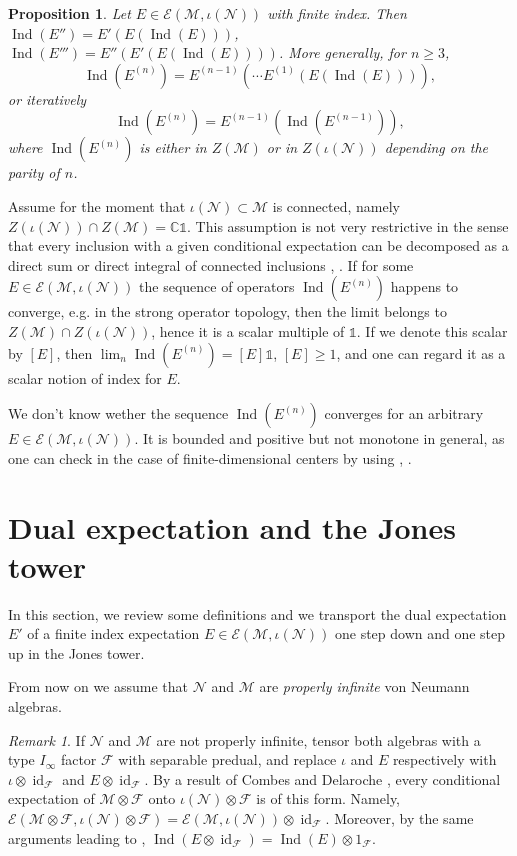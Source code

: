 \documentclass[11pt,a4paper]{article}
\makeatletter
\newcommand{\oneop}{\mathds{1}}
\newcommand{\cF}{\mathcal{F}}
\newcommand{\E}{\mathcal{E}}
\newcommand{\M}{\mathcal{M}}
\newcommand{\N}{\mathcal{N}}
\newcommand{\CC}{\mathbb{C}}
\DeclareMathOperator{\Ind}{Ind}
\DeclareMathOperator{\id}{id}
\DeclareRobustCommand{\eg}{e.g.\@\xspace}
\DeclareRobustCommand{\Prop}{Prop.\@\xspace}
\DeclareRobustCommand{\Lem}{Lem.\@\xspace}
\DeclareRobustCommand{\Thm}{Thm.\@\xspace}
\DeclareRobustCommand{\Rmk}{Rmk.\@\xspace}
\theoremstyle{plain}
\newtheorem{prop}[thm]{Proposition}
\theoremstyle{definition}
\theoremstyle{remark}
\newtheorem{rmk}[thm]{Remark}
\numberwithin{equation}{section}%
\makeatother
\begin{document}
\begin{prop}\label{prop:interateddualexp}
Let $E\in \E(\M,\iota(\N))$ with finite index. Then $\Ind(E'') = E'(E(\Ind(E)))$, $\Ind(E''') = E''(E'(E(\Ind(E))))$. More generally, for $n\geq 3$, 
$$\Ind(E^{(n)}) = E^{(n-1)}(\cdots E^{(1)}(E(\Ind(E)))),$$
or iteratively
$$\Ind(E^{(n)}) = E^{(n-1)}(\Ind(E^{(n-1)})),$$
where $\Ind(E^{(n)})$ is either in $Z(\M)$ or in $Z(\iota(\N))$ depending on the parity of $n$.
\end{prop}

Assume for the moment that $\iota(\N) \subset \M$ is connected, namely $Z(\iota(\N))\cap Z(\M) = \CC\oneop$. This assumption is not very restrictive in the sense that every inclusion with a given conditional expectation can be decomposed as a direct sum or direct integral of connected inclusions \cite[\Rmk 3.4]{Ter92}, \cite[\Thm 1]{FiIs96}. If for some $E\in\E(\M,\iota(\N))$ the sequence of operators $\Ind(E^{(n)})$ happens to converge, \eg in the strong operator topology, then the limit belongs to $Z(\M) \cap Z(\iota(\N))$, hence it is a scalar multiple of $\oneop$. If we denote this scalar by $[E]$, then $\lim_n \Ind(E^{(n)}) = [E] \oneop$, $[E] \geq 1$, and one can regard it as a scalar notion of index for $E$. 

We don't know wether the sequence $\Ind(E^{(n)})$ converges for an arbitrary $E\in\E(\M,\iota(\N))$. It is bounded and positive but not monotone in general, as one can check in the case of finite-dimensional centers by using \cite[\Thm 2.5]{Hav90}, \cite[\Prop 2.3]{Ter92}.


\section{Dual expectation and the Jones tower}\label{sec:dualexp}


In this section, we review some definitions and we transport the dual expectation $E'$ of a finite index expectation $E\in\E(\M,\iota(\N))$ one step down and one step up in the Jones tower.

From now on we assume that $\N$ and $\M$ are \emph{properly infinite} von Neumann algebras.

\begin{rmk}
If $\N$ and $\M$ are not properly infinite, tensor both algebras with a type $I_\infty$ factor $\cF$ with separable predual, and replace $\iota$ and $E$ respectively with $\iota \otimes \id_\cF$ and $E \otimes \id_\cF$. By a result of Combes and Delaroche \cite[\Lem 2.3]{CoDe75}, every conditional expectation of $\M\otimes\cF$ onto $\iota(\N)\otimes\cF$ is of this form. Namely, $\E(\M\otimes\cF,\iota(\N)\otimes\cF) = \E(\M,\iota(\N))\otimes\id_\cF$. 
Moreover, by the same arguments leading to \cite[\Prop 3.6, \Lem 3.7]{Tsu91}, $\Ind(E \otimes \id_\cF) = \Ind(E) \otimes 1_\cF$.
\end{rmk}
\end{document}
